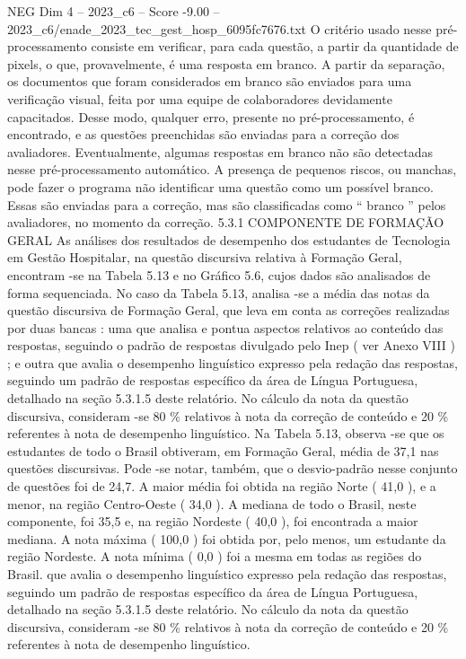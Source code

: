 \begin{textsample}{NEG Dim 4 – 2023\_c6 – Score -9.00 – 2023\_c6/enade\_2023\_tec\_gest\_hosp\_6095fc7676.txt}
O critério usado nesse pré-processamento consiste em verificar, para cada questão, a partir da quantidade de pixels, o que, provavelmente, é uma resposta em branco.
A partir da separação, os documentos que foram considerados em branco são enviados para uma verificação visual, feita por uma equipe de colaboradores devidamente capacitados.
Desse modo, qualquer erro, presente no pré-processamento, é encontrado, e as questões preenchidas são enviadas para a correção dos avaliadores.
Eventualmente, algumas respostas em branco não são detectadas nesse pré-processamento automático.
A presença de pequenos riscos, ou manchas, pode fazer o programa não identificar uma questão como um possível branco.
Essas são enviadas para a correção, mas são classificadas como “ branco ” pelos avaliadores, no momento da correção. 5.3.1 COMPONENTE DE FORMAÇÃO GERAL As análises dos resultados de desempenho dos estudantes de Tecnologia em Gestão Hospitalar, na questão discursiva relativa à Formação Geral, encontram -se na Tabela 5.13 e no Gráfico 5.6, cujos dados são analisados de forma sequenciada.
No caso da Tabela 5.13, analisa -se a média das notas da questão discursiva de Formação Geral, que leva em conta as correções realizadas por duas bancas : uma que analisa e pontua aspectos relativos ao conteúdo das respostas, seguindo o padrão de respostas divulgado pelo Inep ( ver Anexo VIII ) ; e outra que avalia o desempenho linguístico expresso pela redação das respostas, seguindo um padrão de respostas específico da área de Língua Portuguesa, detalhado na seção 5.3.1.5 deste relatório.
No cálculo da nota da questão discursiva, consideram -se 80 \% relativos à nota da correção de conteúdo e 20 \% referentes à nota de desempenho linguístico.
Na Tabela 5.13, observa -se que os estudantes de todo o Brasil obtiveram, em Formação Geral, média de 37,1 nas questões discursivas.
Pode -se notar, também, que o desvio-padrão nesse conjunto de questões foi de 24,7.
A maior média foi obtida na região Norte ( 41,0 ), e a menor, na região Centro-Oeste ( 34,0 ).
A mediana de todo o Brasil, neste componente, foi 35,5 e, na região Nordeste ( 40,0 ), foi encontrada a maior mediana.
A nota máxima ( 100,0 ) foi obtida por, pelo menos, um estudante da região Nordeste.
A nota mínima ( 0,0 ) foi a mesma em todas as regiões do Brasil. que avalia o desempenho linguístico expresso pela redação das respostas, seguindo um padrão de respostas específico da área de Língua Portuguesa, detalhado na seção 5.3.1.5 deste relatório.
No cálculo da nota da questão discursiva, consideram -se 80 \% relativos à nota da correção de conteúdo e 20 \% referentes à nota de desempenho linguístico.

\end{textsample}
